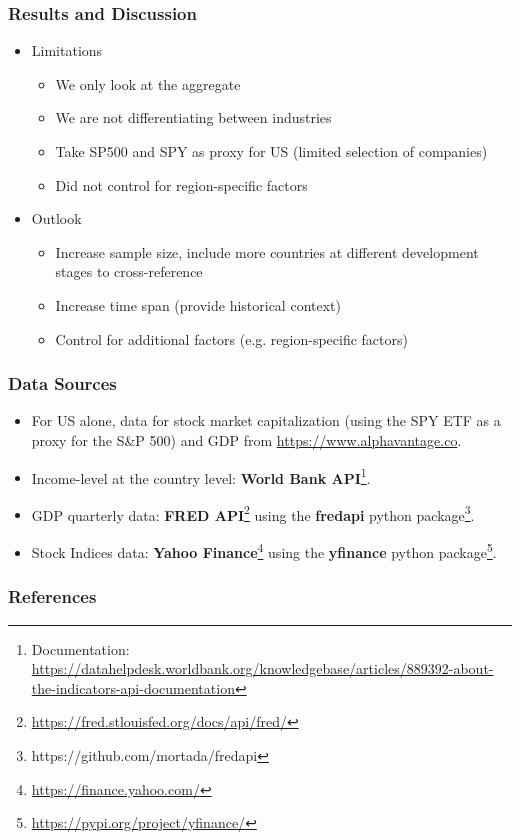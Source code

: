 \documentclass{beamer}
\begin{document}
\begin{frame}
\frametitle{Results and Discussion}
\begin{itemize}
\item Limitations 
\begin{itemize}
\item We only look at the aggregate
\item We are not differentiating between industries
\item Take SP500 and SPY as proxy for US (limited selection of companies) 
\item Did not control for region-specific factors  
\end{itemize}
\item Outlook 
\begin{itemize}
\item Increase sample size, include more countries at different development stages to cross-reference
\item Increase time span (provide historical context)
\item Control for additional factors (e.g. region-specific factors)
\end{itemize}
\end{itemize}
\end{frame}



\begin{frame}
\frametitle{Data Sources}
\begin{itemize}
\begin{itemize}

\item For US alone, data for stock market capitalization (using the SPY ETF as a proxy for the S\&P 500) and GDP from \url{https://www.alphavantage.co}. 
    \item Income-level at the country level: \textbf{World Bank API}\footnote{\tiny Documentation: \url{https://datahelpdesk.worldbank.org/knowledgebase/articles/889392-about-the-indicators-api-documentation}}.
    \item GDP quarterly data:  \textbf{FRED API}\footnote{\tiny\url{https://fred.stlouisfed.org/docs/api/fred/}}
    using the \textbf{fredapi} python package\footnote{\tiny https://github.com/mortada/fredapi}.
    \item Stock Indices data: \textbf{Yahoo Finance}\footnote{\tiny \url{https://finance.yahoo.com/}} using the
    \textbf{yfinance} python package\footnote{\tiny \url{https://pypi.org/project/yfinance/}}.
    

 
\end{itemize}
\end{itemize}
\end{frame}


\begin{frame}[allowframebreaks]
\frametitle{References}
\tiny
\printbibliography
\end{frame}
\end{document}
